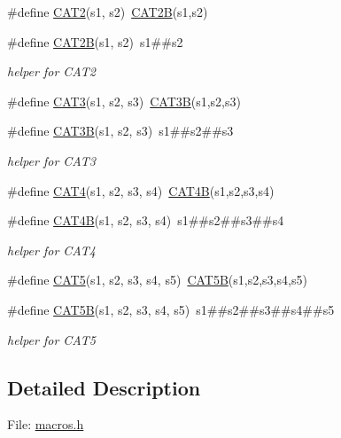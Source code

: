 \begin{DoxyCompactItemize}
\#define \hyperlink{group__macros_ga19a41bff15269d4f73bc19ddd60f9b49}{C\+A\+T2}(s1,  s2)~\hyperlink{group__macros_ga6c0d9118efb88fee629deef5679b5d43}{C\+A\+T2\+B}(s1,s2)
\item 
\#define \hyperlink{group__macros_ga6c0d9118efb88fee629deef5679b5d43}{C\+A\+T2\+B}(s1,  s2)~s1\#\#s2
\begin{DoxyCompactList}\small\item\em helper for C\+A\+T2 \end{DoxyCompactList}\item 
\#define \hyperlink{group__macros_ga27a8cd412723e61cb2167d41ef377e52}{C\+A\+T3}(s1,  s2,  s3)~\hyperlink{group__macros_ga571ec29b3f452590e17789359e1dd82b}{C\+A\+T3\+B}(s1,s2,s3)
\item 
\#define \hyperlink{group__macros_ga571ec29b3f452590e17789359e1dd82b}{C\+A\+T3\+B}(s1,  s2,  s3)~s1\#\#s2\#\#s3
\begin{DoxyCompactList}\small\item\em helper for C\+A\+T3 \end{DoxyCompactList}\item 
\#define \hyperlink{group__macros_ga5db999845f545045f48a5c06617ec607}{C\+A\+T4}(s1,  s2,  s3,  s4)~\hyperlink{group__macros_ga9b815280d04908cbcadec5574f7b2ef9}{C\+A\+T4\+B}(s1,s2,s3,s4)
\item 
\#define \hyperlink{group__macros_ga9b815280d04908cbcadec5574f7b2ef9}{C\+A\+T4\+B}(s1,  s2,  s3,  s4)~s1\#\#s2\#\#s3\#\#s4
\begin{DoxyCompactList}\small\item\em helper for C\+A\+T4 \end{DoxyCompactList}\item 
\#define \hyperlink{group__macros_ga097ed94485f345977faa30a5265ad381}{C\+A\+T5}(s1,  s2,  s3,  s4,  s5)~\hyperlink{group__macros_ga1aff1857e480c6942b3fe80dd1503c36}{C\+A\+T5\+B}(s1,s2,s3,s4,s5)
\item 
\#define \hyperlink{group__macros_ga1aff1857e480c6942b3fe80dd1503c36}{C\+A\+T5\+B}(s1,  s2,  s3,  s4,  s5)~s1\#\#s2\#\#s3\#\#s4\#\#s5
\begin{DoxyCompactList}\small\item\em helper for C\+A\+T5 \end{DoxyCompactList}\end{DoxyCompactItemize}


\subsection{Detailed Description}
File\+: \hyperlink{macros_8h}{macros.\+h}

